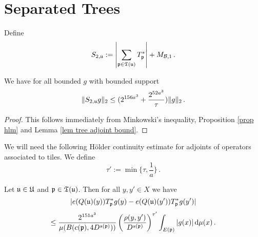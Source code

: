 \section{Separated Trees}
Define 
$$
    S_{2,\mathfrak u} := \left|\sum_{\mathfrak p \in \mathfrak T(\mathfrak u)} T_{\mathfrak p}^* \right| + M_{\mathcal{B},1}\,.
$$
\begin{lemma}
    \label{lem L2 Sg estimate}
    We have for all bounded $g$ with bounded support
    $$
        \|S_{2, \mathfrak u} g\|_2 \le (2^{156a^3} + \frac{2^{52a^3}}{\tau}) \|g\|_2\,.
    $$
\end{lemma}

\begin{proof}
    This follows immediately from Minkowski's inequality, Proposition \ref{prop hlm} and Lemma \ref{lem tree adjoint bound}.
\end{proof}

We will need the following Hölder continuity estimate for adjoints of operators associated to tiles. We define
$$
    \tau' := \min\{\tau, \frac{1}{a}\}\,.
$$
\begin{lemma}
    \label{lem tile Hölder}
    Let $\mathfrak u \in \mathfrak U$ and $\mathfrak p \in \mathfrak T(\mathfrak u)$.  Then for all $y, y' \in X$ we have
    $$
        |e(Q(\mathfrak u)(y)) T_{\mathfrak p}^* g(y) - e(Q(\mathfrak u)(y')) T_{\mathfrak p}^* g(y')|
    $$
    \begin{equation}
        \label{T*Hölder2}
        \le \frac{2^{151a^3}}{\mu(B(c(\mathfrak p), 4D^{s(\mathfrak p)}))} \left(\frac{\rho(y, y')}{D^{s(\mathfrak p)}}\right)^{\tau'}  \int_{E(\mathfrak p)} |g(x)| \, \mathrm{d}\mu(x)\,.
    \end{equation}
\end{lemma}

